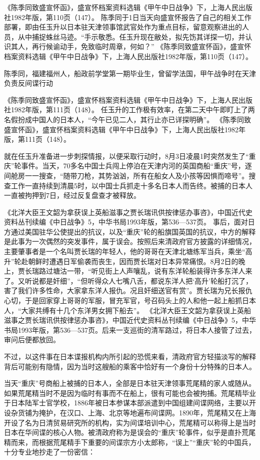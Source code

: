 \documentclass[12pt,UTF8]{ctexbook}
\begin{document}
《陈季同致盛宣怀函》，盛宣怀档案资料选辑《甲午中日战争》下，上海人民出版社1982年版，第110页（147）。
陈季同于1日当天向盛宣怀报告了自己的相关工作部署，即由任玉升以日本驻天津领事馆武官处作为重点目标，留意观察进出的人员，从中捕捉蛛丝马迹。“手示敬悉。任玉升现在敝处，拟先饬其详探一切，并认识其人，再行候谕动手，免致临时周章，何如？” 《陈季同致盛宣怀函》，盛宣怀档案资料选辑《甲午中日战争》下，上海人民出版社1982年版，第110页（147）。


陈季同，福建福州人，船政前学堂第一期毕业生，曾留学法国，甲午战争时在天津负责反间谍行动

《陈季同致盛宣怀函》，盛宣怀档案资料选辑《甲午中日战争》下，上海人民出版社1982年版，第111页（148）。
任玉升的工作极有效率，在第二天中午即盯上了两名假扮成中国人的日本人，“今午已见二人，其行止亦已详探明确”。 《陈季同致盛宣怀函》，盛宣怀档案资料选辑《甲午中日战争》下，上海人民出版社1982年版，第111页（148）。

就在任玉升准备进一步刺探情报，以便采取行动时，8月3日凌晨1时突然发生了“重庆”轮事件。当天，70多名中国士兵闯上停泊在天津内河的英国商船“重庆”号，逐间舱房一一搜查，“随带刀枪，其势汹汹，所有在船女人及小孩等因惧而啼号”。搜查工作一直持续到清晨5时，以中国士兵抓走十多名日本人而告终。被捕的日本人一直被拘押到7日，经过反复盘查才被释放。

《北洋大臣王文韶为拿获误上英船滋事之贾长瑞讯供按律惩办事咨》，中国近代史资料丛刊续编《中日战争》5，中华书局1993年版，第536—537页。
事后，面对日方通过美国驻华公使提出的抗议，以及“重庆”轮的船旗国英国的抗议，中方的解释是此事为一次偶然的突发事件，属于误会。按照后来清政府官方披露的详细情况，主要肇事者是一个名叫贾长瑞的年轻人，他的哥哥在天津北塘练军当兵，乘坐“高升”轮赴朝鲜时遭遇日军偷袭而丧生，因而贾长瑞对日本异常痛恨。8月2日的晚上，贾长瑞路过塘沽一带，“听见街上人声嚷乱，说有东洋轮船装得许多东洋人来了。又听说都是奸细”，“但听得众人七嘴八舌，都说东洋人把‘高升’轮船打沉了，害了我们许多性命，大家拿东洋人报仇。况且奸细送官有赏”。贾长瑞为兄长报仇心切，于是回家穿上哥哥的军服，冒充军官，号召码头上的人和他一起上船抓日本人，“大家共缚有十几个东洋男女拥下船去”。 《北洋大臣王文韶为拿获误上英船滋事之贾长瑞讯供按律惩办事咨》，中国近代史资料丛刊续编《中日战争》5，中华书局1993年版，第536—537页。后来一支巡街的清军路过，将日本人接管了过去，审问后便都放回。

不过，以这件事在日本谍报机构内所引起的恐慌来看，清政府官方轻描淡写的解释背后可能别有隐情，因为当时这艘船的乘客中恰好有一个身份十分特殊的日本人。

当天“重庆”号商船上被捕的日本人，全部是日本驻天津领事荒尾精的家人或随从。如果荒尾精当时不是因为临时有事而不在船上，很有可能也会被拘捕。荒尾精毕业于日本陆军士官学校，1886年被日本参谋本部派遣到中国组建间谍网络，主要以开设杂货铺为掩护，在汉口、上海、北京等地遍布间谍网。1890年，荒尾精又在上海开设了名为日清贸易研究所的机构，实为间谍培训中心，荒尾精可以称得上是当时日本在华间谍的核心人物。被清政府称为是误会的“重庆”轮事件，似乎是直扑荒尾精而来，而根据荒尾精手下重要的间谍宗方小太郎称，“误上”“重庆”轮的中国兵，十分专业地抄走了一份密信：
\end{document}
